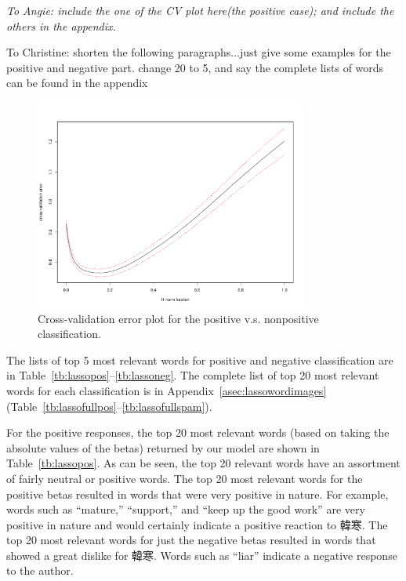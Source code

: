 \documentclass[11pt]{article}
\newcommand{\note}[1]{{\em \color{red} #1}}
\newcommand{\1}[1]{{\mathbf 1}\left\{#1\right\}}        %
\begin{document}
\note{
To Angie: include the one of the CV plot here(the positive case); and include the others in the appendix.

To Christine: shorten the following paragraphs...just give some examples for the positive and negative part.
change 20 to 5, and say the complete lists of words can be found in the appendix
}


\begin{center}
\begin{figure}[tb]
   \centering
   \includegraphics[width=0.8\textwidth]{../lassoResults/CVPosErr.pdf} 
      \caption{Cross-validation error plot for the positive v.s. nonpositive classification. }
   \label{fig:cvplotpos}
\end{figure}
\end{center}

The lists of top 5 most relevant words for positive and negative classification are in Table~\ref{tb:lassopos}--\ref{tb:lassoneg}.
The complete list of top 20 most relevant words for each classification is in Appendix~\ref{asec:lassowordimages} (Table~\ref{tb:lassofullpos}--\ref{tb:lassofullspam}).


For the positive responses, the top 20 most relevant words (based on taking the absolute values of the betas) returned by our model are shown in Table~\ref{tb:lassopos}. As can be seen, the top 20 relevant words have an assortment of fairly neutral or positive words. The top 20 most relevant words for the positive betas resulted in words that were very positive in nature. For example, words such as ``mature,'' ``support,'' and ``keep up the good work'' are very positive in nature and would certainly indicate a positive reaction to 韓寒. The top 20 most relevant words for just the negative betas resulted in words that showed a great dislike for 韓寒.  Words such as ``liar'' indicate a negative response to the author. 
\end{document}
